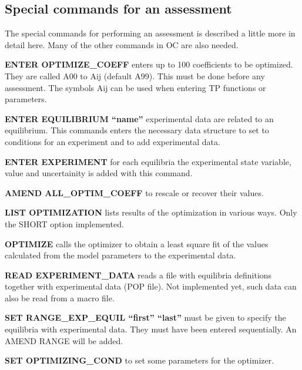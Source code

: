 \documentclass[12pt]{article}
\begin{document}
\subsection{Special commands for an assessment}

The special commands for performing an assessment is described a
little more in detail here.  Many of the other commands in OC are also
needed.

\begin{description}
\item{\bf ENTER OPTIMIZE\_COEFF} enters up to 100 coefficients to be
  optimized.  They are called A00 to Aij (default A99).  This must be
  done before any assessment.  The symbols Aij can be used when
  entering TP functions or parameters.

\item{\bf ENTER EQUILIBRIUM ``name''} experimental data are related to
  an equilibrium.  This commands enters the necessary data structure
  to set to conditions for an experiment and to add experimental data.

\item{\bf ENTER EXPERIMENT} for each equilibria the
  experimental state variable, value and uncertainity is added with
  this command.

\item{\bf AMEND ALL\_OPTIM\_COEFF} to rescale or recover their values.

\item{\bf LIST OPTIMIZATION} lists results of the optimization in
  various ways.  Only the SHORT option implemented.

\item{\bf OPTIMIZE} calls the optimizer to obtain a least square fit
  of the values calculated from the model parameters to the
  experimental data.

\item{\bf READ EXPERIMENT\_DATA} reads a file with equilibria
  definitions together with experimental data (POP file).  Not
  implemented yet, such data can also be read from a macro file.

\item{\bf SET RANGE\_EXP\_EQUIL ``first'' ``last''} must be given to
  specify the equilibria with experimental data.  They must have been
  entered sequentially.  An AMEND RANGE will be added.

\item{\bf SET OPTIMIZING\_COND} to set some parameters for the
  optimizer.


\end{description}
\end{document}
